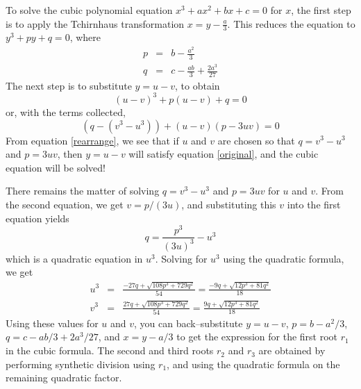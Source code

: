 \documentclass{article}
\newcommand{\0}{\bf{0}}
\newcommand{\<}{\langle}
\renewcommand{\>}{\rangle}
\begin{document}
To solve the cubic polynomial equation $x^3 + ax^2 + bx + c = 0$ for $x$, the first step is to apply the Tchirnhaus transformation $x = y-\frac{a}{3}$. This reduces the equation to $y^3 + py + q = 0$, where
\begin{eqnarray*}
p & = & b - \frac{a^2}{3} \\
q & = & c - \frac{ab}{3} + \frac{2a^3}{27}
\end{eqnarray*}
The next step is to substitute $y = u-v$, to obtain
\begin{equation}\label{original}
(u-v)^3 + p(u-v) + q = 0
\end{equation}
or, with the terms collected,
\begin{equation}\label{rearrange}
(q - (v^3 - u^3)) + (u-v)(p - 3 u v) = 0
\end{equation}
From equation \eqref{rearrange}, we see that if $u$ and $v$ are chosen so that $q = v^3-u^3$ and $p = 3uv$, then $y = u-v$ will satisfy equation \eqref{original}, and the cubic equation will be solved!

There remains the matter of solving $q = v^3-u^3$ and $p = 3uv$ for $u$ and $v$. From the second equation, we get $v = p/(3u)$, and substituting this $v$ into the first equation yields
$$
q = \frac{p^3}{(3u)^3} - u^3
$$
which is a quadratic equation in $u^3$. Solving for $u^3$ using the quadratic formula, we get
\begin{eqnarray*}
u^3 & = & \frac{-27q + \sqrt{108 p^3 + 729 q^2}}{54} = \frac{-9q + \sqrt{12 p^3 + 81 q^2}}{18}\\
v^3 & = & \frac{27q + \sqrt{108 p^3 + 729 q^2}}{54} = \frac{9q + \sqrt{12 p^3 + 81 q^2}}{18}
\end{eqnarray*}
Using these values for $u$ and $v$, you can back--substitute $y=u-v$, $p=b-a^2/3$, $q=c-ab/3+2a^3/27$, and $x = y-a/3$ to get the expression for the first root $r_1$ in the cubic formula. The second and third roots $r_2$ and $r_3$ are obtained by performing synthetic division using $r_1$, and using the quadratic formula on the remaining quadratic factor.
\end{document}
